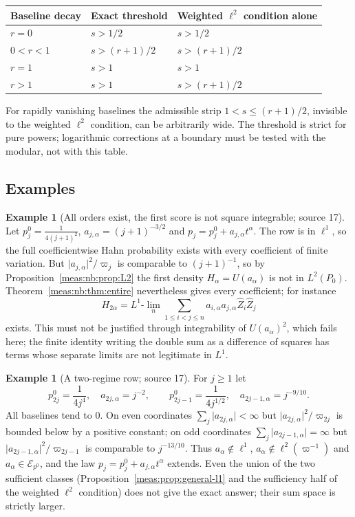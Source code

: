 \documentclass[11pt]{article}
\numberwithin{equation}{section}
\theoremstyle{definition}
\newtheorem{example}[theorem]{Example}
\theoremstyle{remark}
\newcommand{\abs}[1]{\lvert#1\rvert}
\newcommand{\Zh}{\widehat Z}
\newcommand{\Erow}{\mathcal E_{p^0}}
\begin{document}
\begin{center}
\small
\begin{tabular}{@{}lll@{}}
\toprule
Baseline decay & Exact threshold & Weighted $\ell^2$ condition alone\\
\midrule
$r=0$ & $s>1/2$ & $s>1/2$\\
$0<r<1$ & $s>(r+1)/2$ & $s>(r+1)/2$\\
$r=1$ & $s>1$ & $s>1$\\
$r>1$ & $s>1$ & $s>(r+1)/2$\\
\bottomrule
\end{tabular}
\end{center}

For rapidly vanishing baselines the admissible strip $1<s\le(r+1)/2$, invisible to
the weighted $\ell^2$ condition, can be arbitrarily wide. The threshold is strict
for pure powers; logarithmic corrections at a boundary must be tested with the
modular, not with this table.

\subsection{Examples}

\begin{example}[All orders exist, the first score is not square integrable;
source 17]\label{meas:nb:ex:infinitequadratic}
Let $p_j^0=\frac1{4(j+1)^2}$, $a_{j,\alpha}=(j+1)^{-3/2}$ and $p_j=p_j^0+a_{j,\alpha}t^\alpha$.
The row is in $\ell^1$, so the full coefficientwise Hahn probability exists with every
coefficient of finite variation. But $\abs{a_{j,\alpha}}^2/\varpi_j$ is comparable to
$(j+1)^{-1}$, so by Proposition~\ref{meas:nb:prop:L2} the first density
$H_\alpha=U(a_\alpha)$ is not in $L^2(P_0)$. Theorem~\ref{meas:nb:thm:entire} nevertheless
gives every coefficient; for instance
\[
 H_{2\alpha}=L^1\text{-}\lim_n\sum_{1\le i<j\le n}a_{i,\alpha}a_{j,\alpha}\Zh_i\Zh_j
\]
exists. This must not be justified through integrability of $U(a_\alpha)^2$, which
fails here; the finite identity writing the double sum as a difference of squares
has terms whose separate limits are not legitimate in $L^1$.
\end{example}

\begin{example}[A two-regime row; source 17]\label{meas:nb:ex:tworegime}
For $j\ge1$ let
\[
 p_{2j}^0=\frac1{4j^4},\quad a_{2j,\alpha}=j^{-2},\qquad
 p_{2j-1}^0=\frac1{4j^{1/2}},\quad a_{2j-1,\alpha}=j^{-9/10}.
\]
All baselines tend to $0$. On even coordinates $\sum_j\abs{a_{2j,\alpha}}<\infty$ but
$\abs{a_{2j,\alpha}}^2/\varpi_{2j}$ is bounded below by a positive constant; on odd
coordinates $\sum_j\abs{a_{2j-1,\alpha}}=\infty$ but
$\abs{a_{2j-1,\alpha}}^2/\varpi_{2j-1}$ is comparable to $j^{-13/10}$. Thus
$a_\alpha\notin\ell^1$, $a_\alpha\notin\ell^2(\varpi^{-1})$ and $a_\alpha\in\Erow$, and the
law $p_j=p_j^0+a_{j,\alpha}t^\alpha$ extends. Even the union of the two sufficient
classes (Proposition~\ref{meas:prop:general-l1} and the sufficiency half of the
weighted $\ell^2$ condition) does not give the exact answer; their sum space is
strictly larger.
\end{example}
\end{document}
